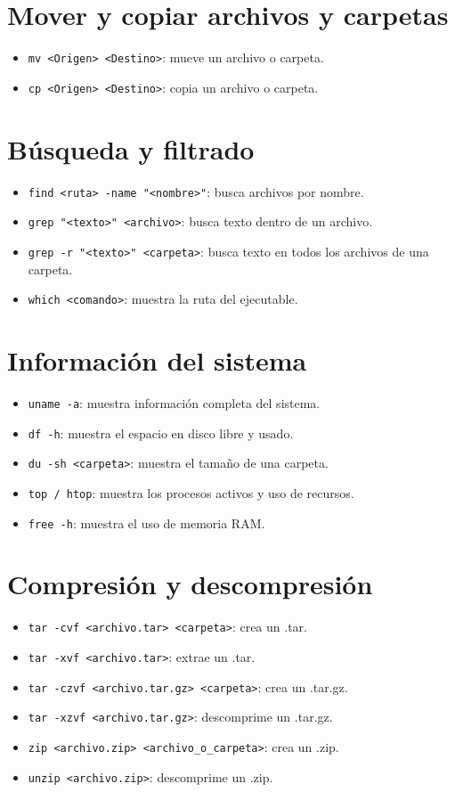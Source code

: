 \documentclass{article}
\begin{document}
\section{Mover y copiar archivos y carpetas}
\begin{itemize}
    \item \texttt{mv <Origen> <Destino>}: mueve un archivo o carpeta.
    \item \texttt{cp <Origen> <Destino>}: copia un archivo o carpeta.
\end{itemize}

\section{Búsqueda y filtrado}
\begin{itemize}
    \item \texttt{find <ruta> -name "<nombre>"}: busca archivos por nombre.
    \item \texttt{grep "<texto>" <archivo>}: busca texto dentro de un archivo.
    \item \texttt{grep -r "<texto>" <carpeta>}: busca texto en todos los archivos de una carpeta.
    \item \texttt{which <comando>}: muestra la ruta del ejecutable.
\end{itemize}

\section{Información del sistema}
\begin{itemize}
    \item \texttt{uname -a}: muestra información completa del sistema.
    \item \texttt{df -h}: muestra el espacio en disco libre y usado.
    \item \texttt{du -sh <carpeta>}: muestra el tamaño de una carpeta.
    \item \texttt{top / htop}: muestra los procesos activos y uso de recursos.
    \item \texttt{free -h}: muestra el uso de memoria RAM.
\end{itemize}

\section{Compresión y descompresión}
\begin{itemize}
    \item \texttt{tar -cvf <archivo.tar> <carpeta>}: crea un .tar.
    \item \texttt{tar -xvf <archivo.tar>}: extrae un .tar.
    \item \texttt{tar -czvf <archivo.tar.gz> <carpeta>}: crea un .tar.gz.
    \item \texttt{tar -xzvf <archivo.tar.gz>}: descomprime un .tar.gz.
    \item \texttt{zip <archivo.zip> <archivo\_o\_carpeta>}: crea un .zip.
    \item \texttt{unzip <archivo.zip>}: descomprime un .zip.
\end{itemize}
\end{document}
